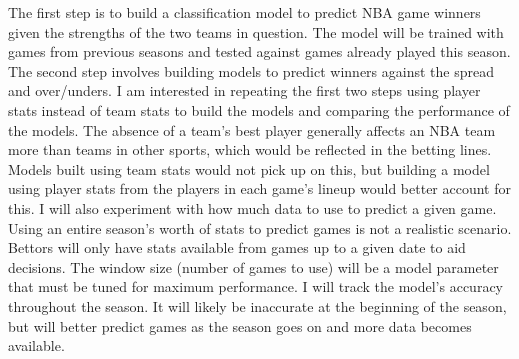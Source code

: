 \documentclass{article}
\begin{document}
The first step is to build a classification model to predict NBA game winners given the strengths of the two teams in question. The model will be trained with games from previous seasons and tested against games already played this season. The second step involves building models to predict winners against the spread and over/unders. I am interested in repeating the first two steps using player stats instead of team stats to build the models and comparing the performance of the models. The absence of a team's best player generally affects an NBA team more than teams in other sports, which would be reflected in the betting lines. Models built using team stats would not pick up on this, but building a model using player stats from the players in each game's lineup would better account for this. I will also experiment with how much data to use to predict a given game. Using an entire season's worth of stats to predict games is not a realistic scenario. Bettors will only have stats available from games up to a given date to aid decisions. The window size (number of games to use) will be a model parameter that must be tuned for maximum performance. I will track the model's accuracy throughout the season. It will likely be inaccurate at the beginning of the season, but will better predict games as the season goes on and more data becomes available.

\printbibliography
\end{document}
